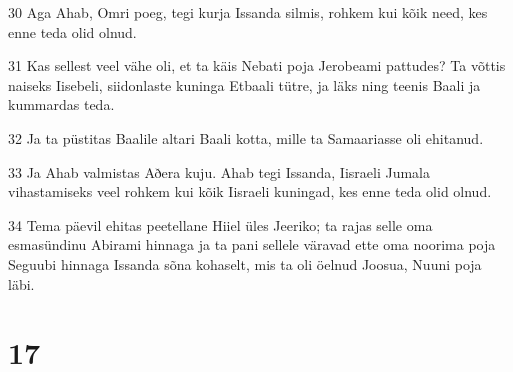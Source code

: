 \par 30 Aga Ahab, Omri poeg, tegi kurja Issanda silmis, rohkem kui kõik need, kes enne teda olid olnud.
\par 31 Kas sellest veel vähe oli, et ta käis Nebati poja Jerobeami pattudes? Ta võttis naiseks Iisebeli, siidonlaste kuninga Etbaali tütre, ja läks ning teenis Baali ja kummardas teda.
\par 32 Ja ta püstitas Baalile altari Baali kotta, mille ta Samaariasse oli ehitanud.
\par 33 Ja Ahab valmistas Aðera kuju. Ahab tegi Issanda, Iisraeli Jumala vihastamiseks veel rohkem kui kõik Iisraeli kuningad, kes enne teda olid olnud.
\par 34 Tema päevil ehitas peetellane Hiiel üles Jeeriko; ta rajas selle oma esmasündinu Abirami hinnaga ja ta pani sellele väravad ette oma noorima poja Seguubi hinnaga Issanda sõna kohaselt, mis ta oli öelnud Joosua, Nuuni poja läbi.

\chapter{17}

